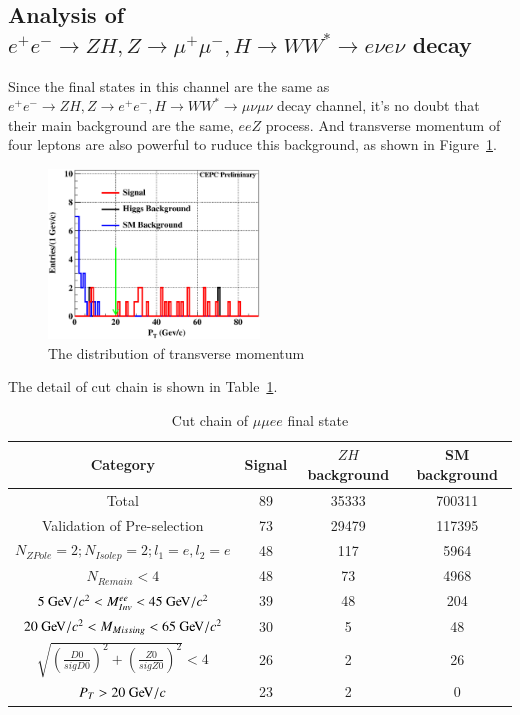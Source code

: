 \documentclass[11pt,a4paper]{cepcnote}
\begin{document}
\subsection{Analysis of $e^+e^- \to ZH, Z \to \mu^+\mu^-, H\to WW^* \to e\nu e\nu$ decay}
Since the final states in this channel are the same as $e^+e^- \to ZH, Z \to e^+e^-, H\to WW^* \to \mu\nu \mu\nu$ decay channel, 
it's no doubt that their main background are the same, $eeZ$ process. 
And transverse momentum of four leptons are also powerful to ruduce this background, as shown in Figure~\ref{fig:ptinuuevev}.
\begin{figure}[H]
	\centering
	\includegraphics[width=0.5\textwidth]{e2e2H/evev/ptinuuevev}
	\caption[]{The distribution of transverse momentum}
	\label{fig:ptinuuevev}
\end{figure}

The detail of cut chain is shown in Table~\ref{tab:cutchainuuevev}.
\begin{table}[H]
  \begin{center}
    \begin{tabular}{cccc}
      \hline \hline
      \multicolumn{1}{c}{Category}&\multicolumn{1}{c}{Signal}&\multicolumn{1}{c}{$ZH$ background}&\multicolumn{1}{c}{SM background}\\ 
      \hline
      Total		       	 									&  89	& 35333	& 700311\\
	  Validation of Pre-selection							&  73	& 29479	& 117395\\
      $N_{ZPole}=2; N_{Isolep}=2; l_1 = e, l_2 = e$		 	&  48	& 117	& 5964	\\
	  $N_{Remain} < 4$										&  48	& 73	& 4968	\\
	  $5\gev/c^2 < M_{Inv}^{ee} < 45\gev/c^2$			   	&  39	& 48	& 204	\\
	  $20\gev/c^2 < M_{Missing} < 65\gev/c^2$	        	&  30	& 5		& 48	\\
	  $\sqrt{(\frac{D0}{sigD0})^2+(\frac{Z0}{sigZ0})^2} < 4$&  26 	& 2		& 26	\\
	  $P_{T} > 20\gev/c$									&  23	& 2		& 0		\\
      \hline \hline
    \end{tabular}
   \caption[Monte Carlo purities in the single lepton sample]{Cut chain of $\mu\mu ee$ final state}
  \label{tab:cutchainuuevev}
 \end{center}
\end{table}
\end{document}
